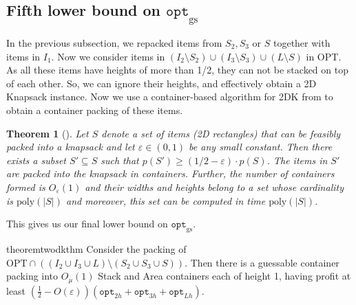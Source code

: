 \documentclass[10pt,a4paper]{amsart}
\newcommand{\eps}{\varepsilon}
\renewcommand{\epsilon}{\varepsilon} %
\newcommand{\container}{container\xspace}
\newtheorem{theorem}{Theorem}[section]
\newtheorem{corollary}[theorem]{Corollary}
\theoremstyle{definition}
\newcommand{\alg}{\mathtt{opt}_{\mathrm{gs}}}
\newcommand{\optgs}{\mathtt{opt}_{\mathrm{gs}}}
\newcommand{\opttwoh}{\mathtt{opt}_{2h}}
\newcommand{\optthreeh}{\mathtt{opt}_{3h}}
\newcommand{\optlh}{\mathtt{opt}_{Lh}}
\begin{document}

\subsection{Fifth lower bound on \texorpdfstring{$\optgs$}{optgs}}
\label{sec:fifthlb}
In the previous subsection, we repacked items from $S_2, S_3$ or $S$ together with items in $I_1$. 
Now we consider items in $(I_2\setminus S_2)\cup (I_3\setminus S_3)\cup (L\setminus S)$ in OPT. As all these items have heights of more than 1/2, they can not be stacked on top of each other. So, we can ignore their heights, and effectively obtain a 2D Knapsack instance. 
Now we use a container-based algorithm for 2DK from \cite{khan2021approximation} to obtain a container packing of these items. 

\begin{theorem} [\cite{khan2021approximation}]
\label{thm:cont2dk}
Let $S$ denote a set of items (2D rectangles) that can be feasibly packed into a knapsack and let $\eps \in (0,1)$ be any small constant.
Then there exists a subset $S' \subseteq S$ such that $p(S') \ge (1/2-\eps) \cdot p(S)$. The items in $S'$ are packed into the knapsack in containers. Further, the number of containers formed is $O_{\eps}(1)$ and their widths and heights belong to a set whose cardinality is $\text{poly}(|S|)$ and
moreover, this set can be computed in time $\text{poly}(|S|)$.
\end{theorem}

This gives us our final lower bound on $\alg$.


\begin{restatable}{theorem}{twodkthm}%
\label{thm:2dknapsack}
    Consider the packing of $\text{OPT}\cap ((I_2\cup I_3\cup L)\setminus (S_2\cup S_3\cup S))$. Then there is a guessable \container packing into $O_{\mu}(1)$ Stack and Area containers each of height 1, having profit at least $\left(\frac{1}{2}-O(\epsilon)\right)(\opttwoh+\optthreeh+\optlh)$.
\end{restatable}



\end{document}
